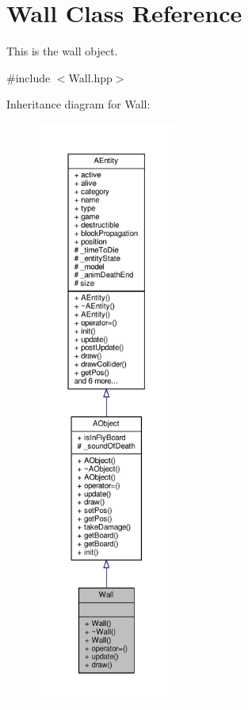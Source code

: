 \hypertarget{class_wall}{}\section{Wall Class Reference}
\label{class_wall}


This is the wall object.  




{\ttfamily \#include $<$Wall.\+hpp$>$}



Inheritance diagram for Wall\+:
\nopagebreak
\begin{figure}[H]
\begin{center}
\leavevmode
\includegraphics[height=550pt]{class_wall__inherit__graph}
\end{center}
\end{figure}


